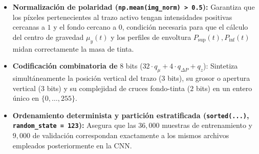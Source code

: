\documentclass[
  spanish,
  us-letterpaper,
]{scrreprt}
\providecommand{\tightlist}{%
  \setlength{\itemsep}{0pt}\setlength{\parskip}{0pt}}
\theoremstyle{definition}
\theoremstyle{remark}
\begin{document}
\begin{itemize}
\tightlist
\item
  \textbf{Normalización de polaridad
  (\texttt{np.mean(img\_norm)\ \textgreater{}\ 0.5}):} Garantiza que los
  píxeles pertenecientes al trazo activo tengan intensidades positivas
  cercanas a \(1\) y el fondo cercano a \(0\), condición necesaria para
  que el cálculo del centro de gravedad \(\mu_y(t)\) y los perfiles de
  envoltura \(P_{\text{sup}}(t), P_{\text{inf}}(t)\) midan correctamente
  la masa de tinta.
\item
  \textbf{Codificación combinatoria de} \(8\) bits
  (\(32 \cdot q_{\mu} + 4 \cdot q_{\Delta P} + q_{z}\)): Sintetiza
  simultáneamente la posición vertical del trazo (\(3\) bits), su grosor
  o apertura vertical (\(3\) bits) y su complejidad de cruces
  fondo-tinta (\(2\) bits) en un entero único en \(\{0, \dots, 255\}\).
\item
  \textbf{Ordenamiento determinista y partición estratificada
  (\texttt{sorted(...)}, \texttt{random\_state\ =\ 123}):} Asegura que
  las \(36{,}000\) muestras de entrenamiento y \(9{,}000\) de validación
  correspondan exactamente a los mismos archivos empleados
  posteriormente en la CNN.
\end{itemize}
\end{document}
